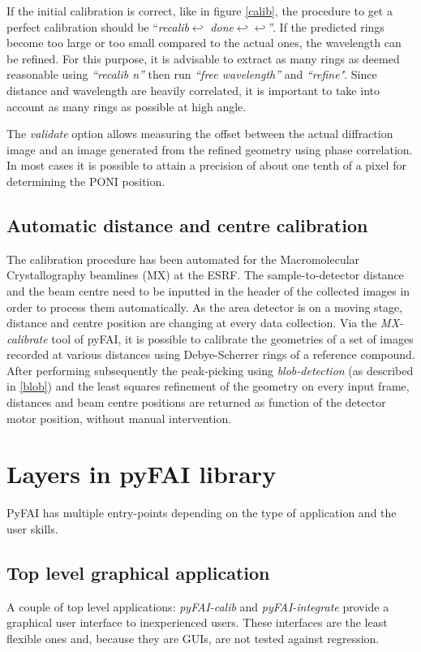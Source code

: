 \documentclass{iucr}
\begin{document}
If the initial calibration is correct, like in figure \ref{calib}, the procedure
to get a perfect calibration should be ``\textit{recalib}$\hookleftarrow $
\textit{done}$\hookleftarrow \hookleftarrow $''.
If the predicted rings become too large or too small compared
to the actual ones, the wavelength can be refined.
For this purpose, it is advisable to  extract as many rings as
deemed reasonable using \textit{``recalib n''} then run \textit{``free wavelength''} and
\textit{``refine"}.
Since distance and wavelength are
heavily correlated, it is important to take into account as many rings as
possible at high angle.

The \textit{validate} option allows measuring the offset between the actual
diffraction image and an image generated from the refined geometry using phase
correlation.
In most cases it is possible to attain a precision of about one tenth of a pixel
for determining the PONI position.

\subsection{Automatic distance and centre calibration}
The calibration procedure has been automated for the  Macromolecular
Crystallography beamlines (MX) at the ESRF.
The sample-to-detector distance and the beam centre need to be inputted in the
header of the collected images in order to process them automatically.
As the area detector is on a moving stage, distance and centre position are
changing at every data collection.
Via the \textit{MX-calibrate} tool of pyFAI, it is possible to calibrate the
geometries of a set of images recorded at various distances using Debye-Scherrer
rings of a reference compound.
After performing subsequently the peak-picking using \textit{blob-detection}
(as described in \ref{blob}) and the least squares refinement of the geometry on
every input frame, distances and beam centre positions are returned as function
of the detector motor position, without manual intervention.

\section{Layers in pyFAI library}
PyFAI has multiple
entry-points depending on the type of application and the user skills.

\subsection{Top level graphical application}
A couple of top level applications: \textit{pyFAI-calib} and
\textit{pyFAI-integrate} provide a graphical user interface to inexperienced
users. 
These interfaces are the least flexible ones and, because they are
GUIs, are not tested against regression.
\end{document}

